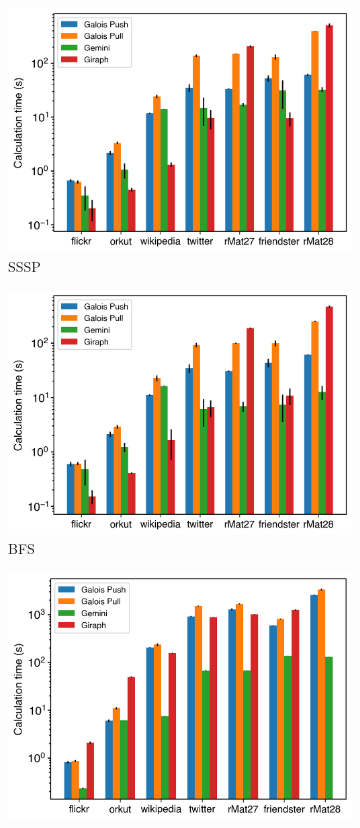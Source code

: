 \documentclass{meetings}
\begin{document}
\begin{figure}[h]
	\begin{subfigure}{0.32\textwidth}
		\includegraphics[width=\linewidth]{../../plots/distributedSSSP_calcTime.png}
		\caption{SSSP}
	\end{subfigure}
	\begin{subfigure}{0.32\textwidth}
		\includegraphics[width=\linewidth]{../../plots/distributedBFS_calcTime.png}
		\caption{BFS}
	\end{subfigure}
	\begin{subfigure}{0.32\textwidth}
		\includegraphics[width=\linewidth]{../../plots/distributedPR_calcTime.png}

\end{subfigure}
\end{figure}
\end{document}
